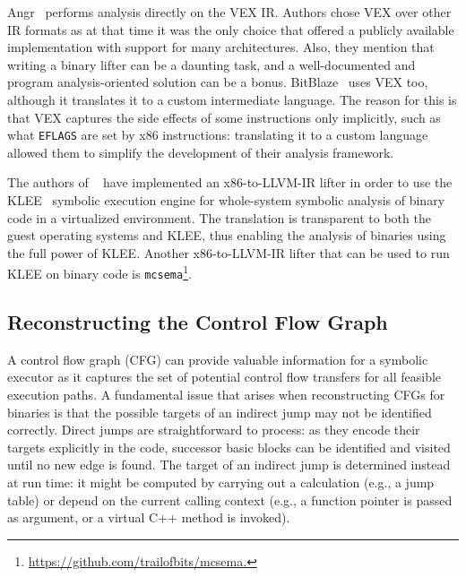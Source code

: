 {\sc Angr}~\cite{ANGR-SSP16} performs analysis directly on the VEX IR. Authors chose VEX over other IR formats as at that time it was the only choice that offered a publicly available implementation with support for many architectures. Also, they mention that writing a binary lifter can be a daunting task, and a well-documented and program analysis-oriented solution can be a bonus. {\sc BitBlaze}~\cite{BITBLAZE-ICISS08} uses VEX too, although it translates it to a custom intermediate language. The reason for this is that VEX captures the side effects of some instructions only implicitly, such as what {\tt EFLAGS} are set by x86 instructions: translating it to a custom language allowed them to simplify the development of their analysis framework.

The authors of {\sc \stwoe}~\cite{CKC-TOCS12} have implemented an x86-to-LLVM-IR lifter in order to use the {\sc KLEE}~\cite{KLEE-OSDI08} symbolic execution engine for whole-system symbolic analysis of binary code in a virtualized environment. The translation is transparent to both the guest operating systems and KLEE, thus enabling the analysis of binaries using the full power of {\sc KLEE}. Another x86-to-LLVM-IR lifter that can be used to run {\sc KLEE} on binary code is {\tt mcsema}\footnote{\url{https://github.com/trailofbits/mcsema.}}.

\subsection{Reconstructing the Control Flow Graph}

A control flow graph (CFG) can provide valuable information for a symbolic executor as it captures the set of potential control flow transfers for all feasible execution paths. A fundamental issue that arises when reconstructing CFGs for binaries is that the possible targets of an indirect jump may not be identified correctly. Direct jumps are straightforward to process: as they encode their targets explicitly in the code, successor basic blocks can be identified and visited until no new edge is found. The target of an indirect jump is determined instead at run time: it might be computed by carrying out a calculation (e.g., a jump table) or depend on the current calling context (e.g., a function pointer is passed as argument, or a virtual C++ method is invoked). %

